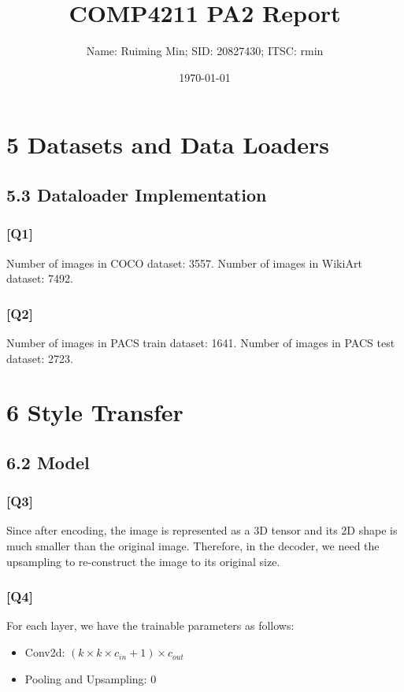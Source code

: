 \documentclass{article}
\title{COMP4211 PA2 Report}
\author{Name: Ruiming Min; SID: 20827430; ITSC: rmin}
\date{\today}
\begin{document}
    
\maketitle

\section*{5 Datasets and Data Loaders}

\subsection*{5.3 Dataloader Implementation}

\subsubsection*{[Q1]}
Number of images in COCO dataset: 3557.
Number of images in WikiArt dataset: 7492.

\subsubsection*{[Q2]}
Number of images in PACS train dataset: 1641.
Number of images in PACS test dataset: 2723.

\newpage

\section*{6 Style Transfer}

\subsection*{6.2 Model}

\subsubsection*{[Q3]}
Since after encoding, the image is represented as a 3D tensor and its 2D shape is much smaller than the original image. 
Therefore, in the decoder, we need the upsampling to re-construct the image to its original size.

\subsubsection*{[Q4]}
For each layer, we have the trainable parameters as follows:
\begin{itemize}
    \item Conv2d: $(k \times k \times c_{in} + 1) \times c_{out}$
    \item Pooling and Upsampling: 0
\end{itemize}
\end{document}
